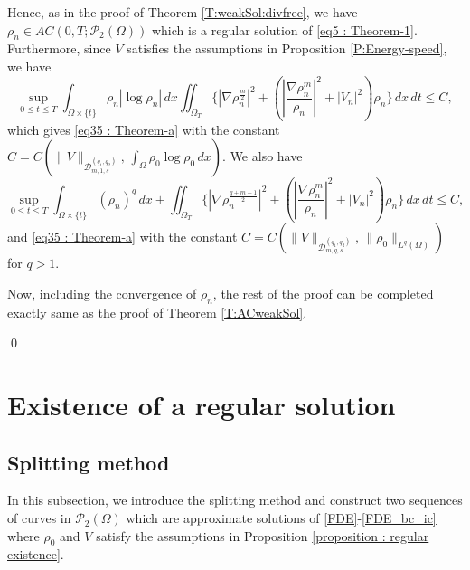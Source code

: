 \documentclass{amsart}
\numberwithin{equation}{section}
\newcommand{\abs}[1]{\left| #1 \right|}
\begin{document}
Hence, as in the proof of Theorem \ref{T:weakSol:divfree}, we have  $\rho_n\in AC(0,T; \mathcal{P}_2(\Omega))$ which is a regular solution of
\eqref{eq5 : Theorem-1}. %
Furthermore, since $V$ satisfies the assumptions in Proposition \ref{P:Energy-speed}, we have
\begin{equation*}\label{eq53 : Theorem-1}
\sup_{0\leq t \leq T}\int_{\Omega \times \{ t\}}\rho_n |\log \rho_n|  \,dx
\iint_{\Omega_T} \{ \abs{\nabla \rho_n^{\frac m2}}^2 + \left(\abs{\frac{\nabla
\rho_n^m}{\rho_n}}^{2}+|V_n|^{2}\right ) \rho_n  \}\,dx\,dt
 \leq  C,
\end{equation*}
which gives \eqref{eq35 : Theorem-a} with the constant $C=C (\|V\|_{\mathcal{D}_{m,1,s}^{(q_1, q_2)}}, \, \int_{\Omega} \rho_0 \log \rho_0 \,dx )$. 
We also have
 \begin{equation*}\label{eq54 : Theorem-1}
\sup_{0\leq t \leq T}\int_{\Omega \times \{ t\}}(\rho_n)^q   \,dx
+ \iint_{\Omega_T} \{ \abs{\nabla \rho_n^{\frac{q+m-1}{2}}}^2 + \left(\abs{\frac{\nabla
\rho_n^m}{\rho_n}}^{2}+|V_n|^{2}\right ) \rho_n  \}\,dx\,dt
 \leq  C,
\end{equation*}
and \eqref{eq35 : Theorem-a} with the constant $C=C (\|V\|_{\mathcal{D}_{m,q,s}^{(q_1, q_2)}}, \, \|\rho_0 \|_{L^{q}(\Omega)} )$ for  $q>1$.
 
Now, including the convergence of $\rho_n$, the rest of the proof can be completed exactly same as the proof of Theorem \ref{T:ACweakSol}.
 

 
\qed



\appendix  
\section{Existence of a regular solution}\label{A:Exist-regular}
\subsection{Splitting method}
 In this subsection, we introduce the splitting method and construct two sequences of curves in
$\mathcal{P}_{2}(\Omega)$ which are approximate solutions of \eqref{FDE}-\eqref{FDE_bc_ic} where $\rho_0$ and $V$ satisfy  the assumptions in Proposition \ref{proposition : regular existence}. %
\end{document}
